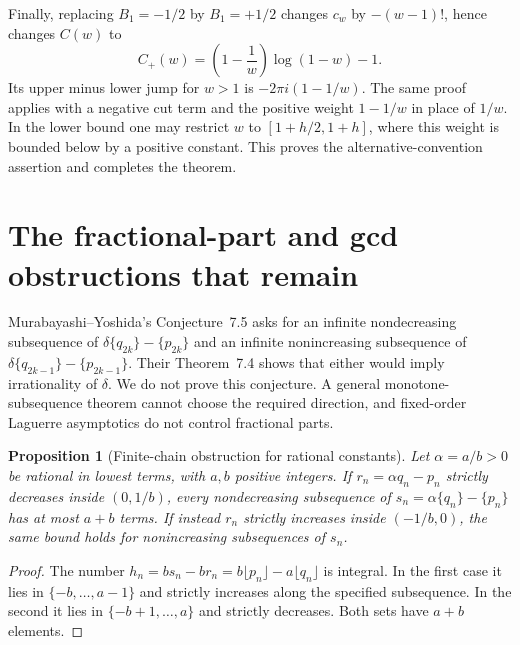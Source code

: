 \documentclass[11pt,a4paper]{article}
\newtheorem{proposition}[theorem]{Proposition}
\theoremstyle{definition}
\theoremstyle{remark}
\numberwithin{equation}{section}
\begin{document}
Finally, replacing $B_1=-1/2$ by $B_1=+1/2$ changes $c_w$ by
$-(w-1)!$, hence changes $C(w)$ to
\[
 C_+(w)=\left(1-\frac1w\right)\log(1-w)-1.
\]
Its upper minus lower jump for $w>1$ is
$-2\pi i(1-1/w)$.  The same proof applies with a negative cut term and
the positive weight $1-1/w$ in place of $1/w$.  In the lower bound one
may restrict $w$ to $[1+h/2,1+h]$, where this weight is bounded below by
a positive constant.  This proves the alternative-convention assertion
and completes the theorem.


\section{The fractional-part and gcd obstructions that remain}
Murabayashi--Yoshida's Conjecture~7.5 asks for an infinite nondecreasing
subsequence of $\delta\{q_{2k}\}-\{p_{2k}\}$ and an infinite nonincreasing
subsequence of $\delta\{q_{2k-1}\}-\{p_{2k-1}\}$.  Their Theorem~7.4 shows
that either would imply irrationality of $\delta$.  We do not prove this
conjecture.  A general monotone-subsequence theorem cannot choose the
required direction, and fixed-order Laguerre asymptotics do not control
fractional parts.

\begin{proposition}[Finite-chain obstruction for rational constants]
Let $\alpha=a/b>0$ be rational in lowest terms, with $a,b$ positive
integers. If
$r_n=\alpha q_n-p_n$ strictly decreases inside $(0,1/b)$, every
nondecreasing subsequence of $s_n=\alpha\{q_n\}-\{p_n\}$ has at most
$a+b$ terms.  If instead $r_n$ strictly increases inside $(-1/b,0)$,
the same bound holds for nonincreasing subsequences of $s_n$.
\end{proposition}
\begin{proof}
The number $h_n=b s_n-b r_n=b\lfloor p_n\rfloor-a\lfloor q_n\rfloor$
is integral.  In the first case it lies in $\{-b,\ldots,a-1\}$ and
strictly increases along the specified subsequence.  In the second it
lies in $\{-b+1,\ldots,a\}$ and strictly decreases.  Both sets have
$a+b$ elements.
\end{proof}
\end{document}
